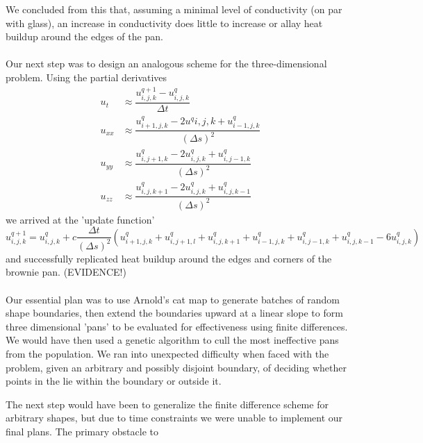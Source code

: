 \documentclass[11pt, fullpage]{article}
\begin{document}
\begin{enumerate}
We concluded from this that, assuming a minimal level of conductivity (on par with glass), an increase in conductivity does little to increase or allay heat buildup around the edges of the pan.\\
\\
Our next step was to design an analogous scheme for the three-dimensional problem.  Using the partial derivatives
\begin{align*}
u_t &\approx \dfrac{u_{i,j,k}^{q+1} - u_{i,j,k}^q}{\Delta t}\\
u_{xx} &\approx \dfrac{u_{i+1,j,k}^q - 2u^q{i,j,k} + u_{i-1,j,k}^q}{(\Delta s)^2}\\
u_{yy} &\approx \dfrac{u_{i,j+1,k}^q - 2u_{i,j,k}^q + u_{i,j-1,k}^q}{(\Delta s)^2}\\
u_{zz} &\approx \dfrac{u_{i,j,k+1}^q - 2u_{i,j,k}^q + u_{i,j,k-1}^q}{(\Delta s)^2} \end{align*} 
we arrived at the 'update function'
\[u^{q+1}_{i,j,k} = u^q_{i,j,k} + c \frac{\Delta t}{(\Delta s)^2} \left(u^q_{i+1,j,k} + u^q_{i,j+1,l} + u^q_{i,j,k+1} + u^q_{i-1,j,k} + u^q_{i,j-1,k} + u^q_{i,j,k-1} - 6u^q_{i,j,k} \right)\]
and successfully replicated heat buildup around the edges and corners of the brownie pan. (EVIDENCE!)\\
\\
Our essential plan was to use Arnold's cat map to generate batches of random shape boundaries, then extend the boundaries upward at a linear slope to form three dimensional 'pans' to be evaluated for effectiveness using finite differences.  We would have then used a genetic algorithm to cull the most ineffective pans from the population.  We ran into unexpected difficulty when faced with the problem, given an arbitrary and possibly disjoint boundary, of deciding whether points in the lie within the boundary or outside it. 

 
The next step would have been to generalize the finite difference scheme for arbitrary shapes, but due to time constraints we were unable to implement our final plans.  The primary obstacle to 
\end{enumerate}
\end{document}
